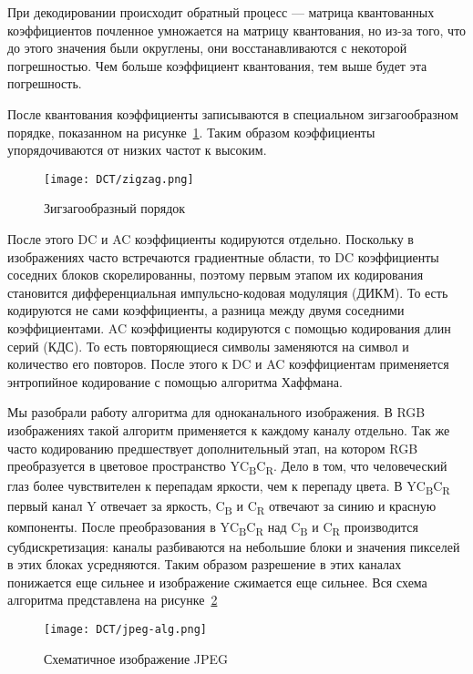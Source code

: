 При декодировании происходит обратный процесс --- матрица квантованных коэффициентов
почленное умножается на матрицу квантования, но из-за того, что до этого значения были округлены,
они восстанавливаются с некоторой погрешностью. Чем больше коэффициент квантования,
тем выше будет эта погрешность.

После квантования коэффициенты записываются в специальном зигзагообразном порядке,
показанном на рисунке~\ref{img:zigzag}. Таким образом коэффициенты упорядочиваются
от низких частот к высоким.
\begin{figure}[ht]
    \centering
    \caption{Зигзагообразный порядок}
    \texttt{[image: DCT/zigzag.png]}
    \label{img:zigzag}
\end{figure}
После этого DC и AC коэффициенты кодируются отдельно.
Поскольку в изображениях часто встречаются
градиентные области, то DC коэффициенты соседних блоков
скорелированны, поэтому первым этапом их кодирования
становится дифференциальная импульсно-кодовая модуляция (ДИКМ).
То есть кодируются не сами коэффициенты, а разница между двумя
соседними коэффициентами.
AC коэффициенты кодируются с помощью кодирования длин серий (КДС).
То есть повторяющиеся символы заменяются на символ и количество его повторов.
После этого к DC и AC коэффициентам применяется энтропийное кодирование с помощью
алгоритма Хаффмана.

Мы разобрали работу алгоритма для одноканального изображения.
В RGB изображениях такой алгоритм применяется к каждому каналу отдельно.
Так же часто кодированию предшествует дополнительный этап,
на котором RGB преобразуется в цветовое пространство
YC\textsubscript{B}C\textsubscript{R}.
Дело в том, что человеческий глаз более чувствителен к перепадам
яркости, чем к перепаду цвета.
В YC\textsubscript{B}C\textsubscript{R} первый канал Y отвечает за яркость,
C\textsubscript{B} и C\textsubscript{R} отвечают за синию и красную компоненты.
После преобразования в YC\textsubscript{B}C\textsubscript{R}
над C\textsubscript{B} и C\textsubscript{R} производится субдискретизация:
каналы разбиваются на небольшие блоки и значения пикселей в этих блоках усредняются.
Таким образом разрешение в этих каналах понижается еще сильнее
и изображение сжимается еще сильнее.
Вся схема алгоритма представлена на рисунке~\ref{img:jpeg-alg}
\begin{figure}[ht]
    \centering
    \caption{Схематичное изображение JPEG}
    \texttt{[image: DCT/jpeg-alg.png]}
    \label{img:jpeg-alg}
\end{figure}

